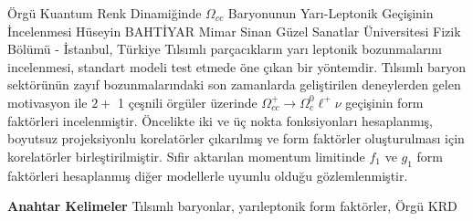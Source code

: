 
    \begin{abstract_online}{Örgü Kuantum Renk Dinamiğinde $\Omega_{c c}$ Baryonunun Yarı-Leptonik Geçişinin İncelenmesi}{%
        Hüseyin BAHTİYAR}{%
        }{%
        Mimar Sinan Güzel Sanatlar Üniversitesi Fizik Bölümü - İstanbul, Türkiye}
    Tılsımlı parçacıkların yarı leptonik bozunmalarını incelenmesi, standart modeli test etmede öne çıkan bir yöntemdir. Tılsımlı baryon sektörünün zayıf bozunmalarındaki son zamanlarda geliştirilen deneylerden gelen motivasyon ile $2+$ 1 çeşnili örgüler üzerinde $\Omega_{c c}^{+} \rightarrow \Omega_{c}^{0} \ell^{+} \nu$ geçişinin form faktörleri incelenmiştir. Öncelikte iki ve üç nokta fonksiyonları hesaplanmış, boyutsuz projeksiyonlu korelatörler çıkarılmış ve form faktörler oluşturulması için korelatörler birleştirilmiştir. Sıfir aktarılan momentum limitinde $f_{1}$ ve $g_{1}$ form faktörleri hesaplanmış diğer modellerle uyumlu olduğu gözlemlenmiştir. 
    
            \textbf{Anahtar Kelimeler} \newline{}Tılsımlı baryonlar, yarıleptonik form faktörler, Örgü KRD
    \end{abstract_online}
    